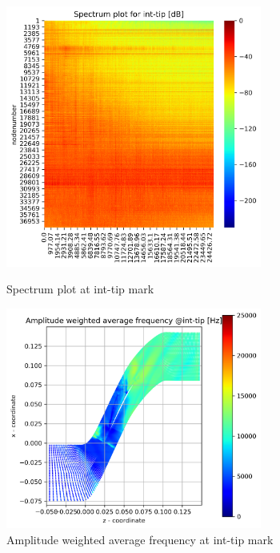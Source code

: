 \begin{figure}[ht]
  \centering
  \includegraphics[width=0.75\textwidth]{Figures/int-tip_spectrum.png}
  \caption{Spectrum plot at int-tip mark} \label{int-tip-spectrum}
  
  \vspace*{\floatsep}%

  \includegraphics[width=0.75\textwidth]{Figures/int-tip-awaf.png}
  \caption{Amplitude weighted average frequency at int-tip mark} \label{int-12-awaf}
\end{figure}
